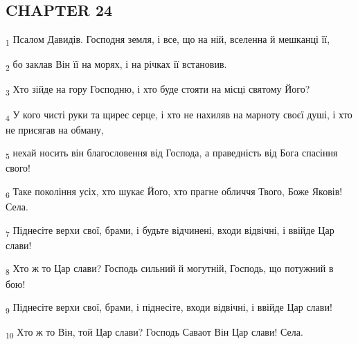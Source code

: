 \subsection{CHAPTER 24}
\begin{tcolorbox}
\textsubscript{1} Псалом Давидів. Господня земля, і все, що на ній, вселенна й мешканці її,
\end{tcolorbox}
\begin{tcolorbox}
\textsubscript{2} бо заклав Він її на морях, і на річках її встановив.
\end{tcolorbox}
\begin{tcolorbox}
\textsubscript{3} Хто зійде на гору Господню, і хто буде стояти на місці святому Його?
\end{tcolorbox}
\begin{tcolorbox}
\textsubscript{4} У кого чисті руки та щиреє серце, і хто не нахиляв на марноту своєї душі, і хто не присягав на обману,
\end{tcolorbox}
\begin{tcolorbox}
\textsubscript{5} нехай носить він благословення від Господа, а праведність від Бога спасіння свого!
\end{tcolorbox}
\begin{tcolorbox}
\textsubscript{6} Таке покоління усіх, хто шукає Його, хто прагне обличчя Твого, Боже Яковів! Села.
\end{tcolorbox}
\begin{tcolorbox}
\textsubscript{7} Піднесіте верхи свої, брами, і будьте відчинені, входи відвічні, і ввійде Цар слави!
\end{tcolorbox}
\begin{tcolorbox}
\textsubscript{8} Хто ж то Цар слави? Господь сильний й могутній, Господь, що потужний в бою!
\end{tcolorbox}
\begin{tcolorbox}
\textsubscript{9} Піднесіте верхи свої, брами, і піднесіте, входи відвічні, і ввійде Цар слави!
\end{tcolorbox}
\begin{tcolorbox}
\textsubscript{10} Хто ж то Він, той Цар слави? Господь Саваот Він Цар слави! Села.
\end{tcolorbox}
